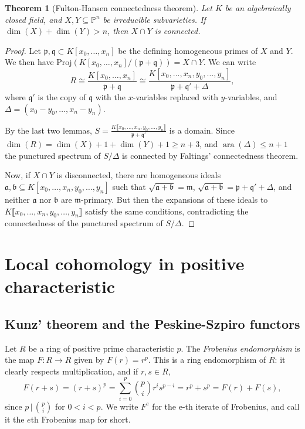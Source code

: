 \documentclass[11pt]{book}
\newtheorem{theorem}{Theorem}[chapter]
\numberwithin{equation}{section}
\numberwithin{theorem}{chapter}
\theoremstyle{definition}
\newtheorem*{basic properties}{Basic Properties}
\newtheorem*{Important Remark}{Important Remark}
\theoremstyle{remark}
\newcommand{\PP}{\mathbb{P}}
\newcommand{\m}{\mathfrak{m}}
\newcommand{\p}{\mathfrak{p}}
\newcommand{\q}{\mathfrak{q}}
\renewcommand{\aa}{\mathfrak{a}}
\newcommand{\bb}{\mathfrak{b}}
\newcommand{\ara}{\operatorname{ara}}
\renewcommand{\dim}{\operatorname{dim}}
\begin{document}
\begin{theorem}[Fulton-Hansen connectedness theorem]
	Let $K$ be an algebraically closed field, and $X,Y\subseteq \PP^n$ be irreducible subvarieties. If $\dim(X) + \dim(Y) > n$, then $X\cap Y$ is connected.
	\end{theorem}
\begin{proof}
	Let $\p,\q \subset K[x_0,\dots,x_n]$ be the defining homogeneous primes of $X$ and $Y$. We then have ${\mathrm{Proj}(K[x_0,\dots,x_n]/(\p+\q))=X\cap Y}$. We can write
	\[ R\cong \frac{K[x_0,\dots,x_n]}{\p+\q} \cong \frac{K[x_0,\dots,x_n,y_0,\dots,y_n]}{\p+\q' + \Delta},  \]
	 where $\q'$ is the copy of $\q$ with the $x$-variables replaced with $y$-variables, and $\Delta={(x_0-y_0,\dots,x_n-y_n)}$. 
	
	By the last two lemmas, $S=\displaystyle \frac{K\llbracket x_0,\dots,x_n,y_0,\dots,y_n \rrbracket}{\p+\q'}$ is a domain. Since $\dim(R)=\dim(X)+1+\dim(Y)+1 \geq n+3$, and $\ara(\Delta)\leq n+1$ the punctured spectrum of $S/\Delta$ is connected by Faltings' connectedness theorem.
	
	Now, if $X\cap Y$ is disconnected, there are homogeneous ideals $\aa,\bb\subseteq K[x_0,\dots,x_n,y_0,\dots,y_n]$ such that $\sqrt{\aa+\bb}=\m$, $\sqrt{\aa+\bb}=\p+\q'+\Delta$, and neither $\aa$ nor $\bb$ are $\m$-primary. But then the expansions of these ideals to $K\llbracket x_0,\dots,x_n,y_0,\dots,y_n \rrbracket$ satisfy the same conditions, contradicting the connectedness of the punctured spectrum of $S/\Delta$.
\end{proof}



\chapter{Local cohomology in positive characteristic}

\section{Kunz' theorem and the Peskine-Szpiro functors}

Let $R$ be a ring of positive prime characteristic $p$. The \emph{Frobenius endomorphism} is the map $F:R\to R$ given by $F(r)=r^p$. This is a ring endomorphism of $R$: it clearly respects multiplication, and if $r,s\in R$, 
\[ F(r+s)=(r+s)^p = \sum_{i=0}^p \binom{p}{i} r^i s^{p-i} = r^p + s^p = F(r)+F(s),\]
since $p \,  | \, \binom{p}{i}$ for $0<i<p$. We write $F^e$ for the e-th iterate of Frobenius, and call it the $e$th Frobenius map for short.
\end{document}
